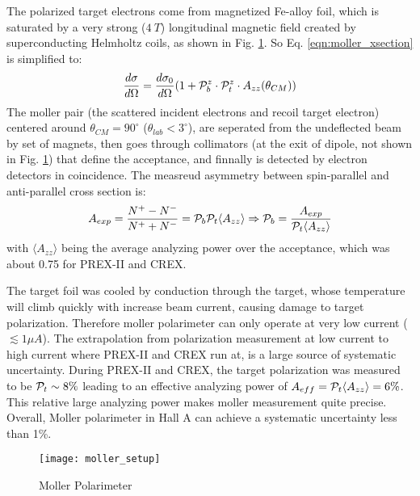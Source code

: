 The polarized target electrons come from magnetized Fe-alloy foil, which is 
saturated by a very strong ($4\ T$) longitudinal magnetic field created by 
superconducting Helmholtz coils, as shown in Fig. \ref{fig:moller_polarimeter}. 
So Eq. \ref{eqn:moller_xsection} is simplified to:
\begin{equation}
    \frac{d\sigma}{d\Omega} = \frac{d\sigma_0}{d\Omega} ( 1 + \mathcal{P}_b^z \cdot \mathcal{P}_t^z \cdot A_{zz}(\theta_{CM}))
    \label{eqn:moller_xsection_1}
\end{equation}
The moller pair (the scattered incident electrons and recoil target electron)
centered around $\theta_{CM} = 90^\circ$ ($\theta_{lab} < 3^\circ$), 
are seperated from the undeflected beam by set of magnets, then goes through
collimators (at the exit of dipole, not shown in Fig. \ref{fig:moller_polarimeter}) 
that define the acceptance, and finnally is detected by electron detectors in coincidence.
The measreud asymmetry between spin-parallel and anti-parallel cross section is:
\begin{equation}
    A_{exp} = \frac{N^+ - N^-}{N^+ + N^-} = \mathcal{P}_b \mathcal{P}_t \langle A_{zz} \rangle 
    \Rightarrow
    \mathcal{P}_b = \frac{A_{exp}}{\mathcal{P}_t \langle A_{zz} \rangle}
\end{equation}
with $\langle A_{zz} \rangle$ being the average analyzing power over the acceptance,
which was about 0.75 for PREX-II and CREX.

The target foil was cooled by conduction through the target, whose temperature 
will climb quickly with increase beam current, causing damage to target
polarization. Therefore moller polarimeter can only operate at very low current ($\lesssim 1\mu A$).
The extrapolation from polarization measurement at low current to high current
where PREX-II and CREX run at, is a large source of systematic uncertainty.
During PREX-II and CREX, the target polarization was measured to be $\mathcal{P}_t \sim 8\%$ 
leading to an effective analyzing power of $A_{eff} = \mathcal{P}_t\langle A_{zz} \rangle = 6\%$.
This relative large analyzing power makes moller measurement quite precise.
Overall, Moller polarimeter in Hall A can achieve a systematic uncertainty less
than 1\%.

\begin{figure}[h!]
    \centering
    \texttt{[image: moller\_setup]}
    \caption{Moller Polarimeter}
    \label{fig:moller_polarimeter}
\end{figure}

